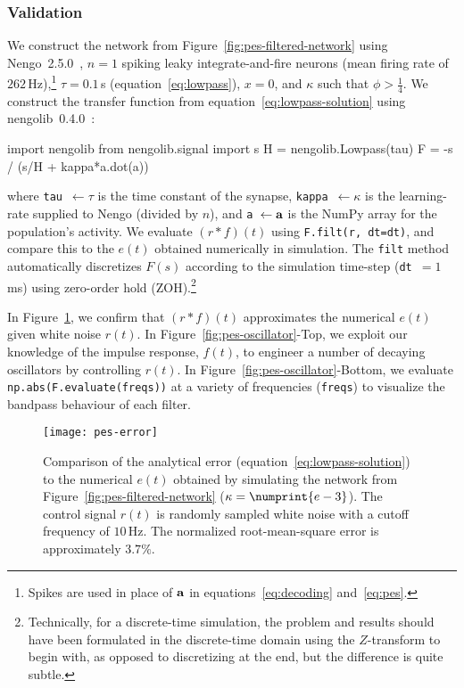 \subsubsection{Validation}

We construct the network from Figure~\ref{fig:pes-filtered-network} using Nengo~2.5.0~\citep{bekolay2013}, $n = 1$ spiking leaky integrate-and-fire neurons (mean firing rate of $262\,$Hz),\footnote{Spikes are used in place of $\mathbf{a}$ in equations~\ref{eq:decoding} and~\ref{eq:pes}.} $\tau = 0.1\,$s (equation~\ref{eq:lowpass}), $x = 0$, and $\kappa$ such that $\phi > \frac{1}{4}$.
We construct the transfer function from equation~\ref{eq:lowpass-solution} using nengolib~0.4.0~\citep{nengolib}:
\begin{python}
import nengolib
from nengolib.signal import s
H = nengolib.Lowpass(tau)
F = -s / (s/H + kappa*a.dot(a))
\end{python}
where \texttt{tau}~$\leftarrow \tau$ is the time constant of the synapse, \texttt{kappa}~$\leftarrow \kappa$ is the learning-rate supplied to Nengo (divided by $n$), and \texttt{a}~$\leftarrow \mathbf{a}$ is the NumPy array for the population's activity.
We evaluate $(r \ast f)(t)$ using \texttt{F.filt(r, dt=dt)}, and compare this to the $e(t)$ obtained numerically in simulation.
The \texttt{filt} method automatically discretizes $F(s)$ according to the simulation time-step (\texttt{dt}~$= 1\,$ms) using zero-order hold (ZOH).\footnote{Technically, for a discrete-time simulation, the problem and results should have been formulated in the discrete-time domain using the $Z$-transform to begin with, as opposed to discretizing at the end, but the difference is quite subtle.}

In Figure~\ref{fig:pes-error}, we confirm that $(r \ast f)(t)$ approximates the numerical $e(t)$ given white noise $r(t)$.
In Figure~\ref{fig:pes-oscillator}-Top, we exploit our knowledge of the impulse response, $f(t)$, to engineer a number of decaying oscillators by controlling $r(t)$.
In Figure~\ref{fig:pes-oscillator}-Bottom, we evaluate \texttt{np.abs(F.evaluate(freqs))} at a variety of frequencies (\texttt{freqs}) to visualize the bandpass behaviour of each filter.

\begin{figure}
\centering
\texttt{[image: pes-error]}
\caption{ \label{fig:pes-error}
  Comparison of the analytical error (equation~\ref{eq:lowpass-solution}) to the numerical $e(t)$ obtained by simulating the network from Figure~\ref{fig:pes-filtered-network} ($\kappa = \numprint{e-3}$).
  The control signal $r(t)$ is randomly sampled white noise with a cutoff frequency of $10\,$Hz.
  The normalized root-mean-square error is approximately $3.7\%$.
}
\end{figure}

